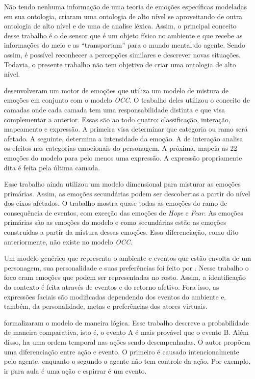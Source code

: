 Não tendo nenhuma informação de uma teoria de emoções específicas modeladas em
sua ontologia, \citet{wks2008towards} criaram uma ontologia de alto nível se
aproveitando de outra ontologia de alto nível e de uma de analise léxica.
Assim, o principal conceito desse trabalho é o de sensor que é um objeto
físico no ambiente e que recebe as informações do meio e as ``transportam''
para o mundo mental do agente. Sendo assim, é possível reconhecer a
percepções similares e descrever novas situações. Todavia, o presente trabalho
não tem objetivo de criar uma ontologia de alto nível\dev{}.

\citet{springerlink:10.1007/978-3-642-01639-448} desenvolveram um motor de
emoções que utiliza um modelo de mistura de emoções em conjunto com o modelo
\emph{OCC}. O trabalho deles utilizou o conceito de camadas onde cada camada tem uma
responsabilidade distinta e que visa complementar a anterior. Essas são ao todo
quatro: classificação, interação, mapeamento e expressão. A primeira visa
determinar que categoria ou ramo será afetado. A seguinte, determina a
intensidade da emoção. A de interação analisa os efeitos nas categorias
emocionais do personagem. A próxima, mapeia as 22 emoções do modelo para pelo
menos uma expressão. A expressão propriamente dita é feita pela última camada.

Esse trabalho ainda utilizou um modelo dimensional para misturar as emoções
primárias. Assim, as emoções secundárias podem ser descobertas a partir do
nível dos eixos afetados. O trabalho mostra quase todas as emoções do
ramo de consequência de eventos, com exceção das emoções de \emph{Hope} e
\emph{Fear}. As emoções primárias são as emoções do modelo \occ e como
secundárias estão as emoções construídas a partir da mistura dessas emoções.
Essa diferenciação, como dito anteriormente, não existe no modelo \emph{OCC}.

Um modelo genérico que representa o ambiente e eventos que estão envolta de um
personagem, sua personalidade e suas preferências foi feito por
\citet{lera2009semantic}. Nesse trabalho o foco eram emoções que podem ser
representadas no rosto. Assim, a identificação do contexto é feita através de
eventos e do retorno afetivo. Fora isso, as expressões faciais são modificadas
dependendo dos eventos do ambiente e, também, da personalidade, metas e
preferências dos atores virtuais.

\citet{adam2009alfototoe} formalizaram o modelo \occ de maneira lógica.
Esse trabalho descreve a probabilidade de maneira comparativa, isto é, o
evento A é mais provável que o evento B. Além disso, ha uma ordem temporal nas
ações sendo desempenhadas. O autor propõem uma diferenciação entre ação e
evento. O primeiro é causado intencionalmente pelo agente\dev{},
enquanto o segundo o agente não tem controle da ação. Por exemplo, ir para
aula é uma ação e espirrar é um evento.


